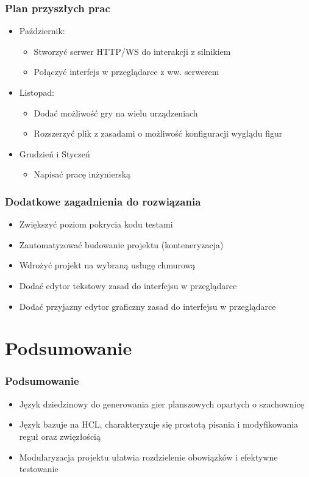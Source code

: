 \documentclass{beamer}
\begin{document}
\begin{frame}
	\frametitle{Plan przyszłych prac}
	\begin{itemize}
		\item Październik:
		      \begin{itemize}
			      \item Stworzyć serwer HTTP/WS do interakcji z silnikiem
			      \item Połączyć interfejs w przeglądarce z ww. serwerem
		      \end{itemize}
		\item Listopad:
		      \begin{itemize}
			      \item Dodać możliwość gry na wielu urządzeniach
			      \item Rozszerzyć plik z zasadami o możliwość konfiguracji wyglądu figur
		      \end{itemize}
		\item Grudzień i Styczeń
		      \begin{itemize}
			      \item Napisać pracę inżynierską
		      \end{itemize}
	\end{itemize}
\end{frame}

\begin{frame}
	\frametitle{Dodatkowe zagadnienia do rozwiązania}
	\begin{itemize}
		\item Zwiększyć poziom pokrycia kodu testami
		\item Zautomatyzować budowanie projektu (konteneryzacja)
		\item Wdrożyć projekt na wybraną usługę chmurową
		\item Dodać edytor tekstowy zasad do interfejsu w przeglądarce
		\item Dodać przyjazny edytor graficzny zasad do interfejsu w przeglądarce
	\end{itemize}
\end{frame}

\section{Podsumowanie}

\begin{frame}
	\frametitle{Podsumowanie}

	\begin{itemize}
		\item Język dziedzinowy do generowania gier planszowych opartych o szachownicę
		\item Język bazuje na HCL, charakteryzuje się prostotą pisania i modyfikowania reguł oraz zwięzłością
		\item Modularyzacja projektu ułatwia rozdzielenie obowiązków i efektywne testowanie
	\end{itemize}
\end{frame}
\end{document}

